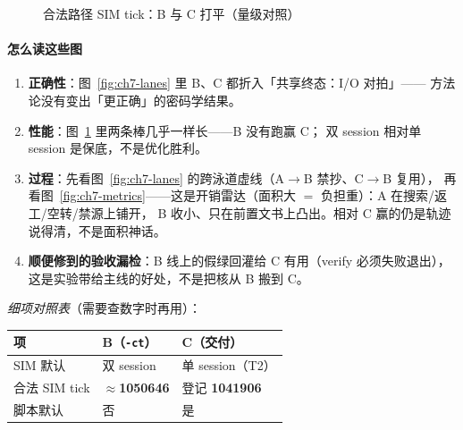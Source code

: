 \documentclass[UTF8,a4paper,11pt]{ctexart}
\theoremstyle{definition}
\theoremstyle{plain}
\theoremstyle{remark}
\numberwithin{figure}{section}
\numberwithin{table}{section}
\begin{document}
\begin{figure}[H]
\centering
{}
\caption{合法路径 SIM tick：B 与 C 打平（量级对照）}
\label{fig:ch7-tick}
\end{figure}

\paragraph{怎么读这些图}
\begin{enumerate}
  \item \textbf{正确性}：图~\ref{fig:ch7-lanes} 里 B、C 都折入「共享终态：I/O 对拍」——
        方法论没有变出「更正确」的密码学结果。
  \item \textbf{性能}：图~\ref{fig:ch7-tick} 里两条棒几乎一样长——B 没有跑赢 C；
        双 session 相对单 session 是保底，不是优化胜利。
  \item \textbf{过程}：先看图~\ref{fig:ch7-lanes} 的跨泳道虚线（A$\to$B 禁抄、C$\to$B 复用），
        再看图~\ref{fig:ch7-metrics}——这是开销雷达（面积大 $=$ 负担重）：A 在搜索/返工/空转/禁源上铺开，
        B 收小、只在前置文书上凸出。相对 C 赢的仍是轨迹说得清，不是面积神话。
  \item \textbf{顺便修到的验收漏检}：B 线上的假绿回灌给 C 有用（verify 必须失败退出），
        这是实验带给主线的好处，不是把核从 B 搬到 C。
\end{enumerate}

\noindent\textit{细项对照表}（需要查数字时再用）：
\begin{center}
\small
\begin{tabular}{@{}L{2.8cm}L{5.2cm}L{5.2cm}@{}}
  \toprule
  项 & B（\texttt{-ct}） & C（交付） \\
  \midrule
  SIM 默认 & 双 session & 单 session（T2） \\
  合法 SIM tick & $\approx$\textbf{1050646} & 登记 \textbf{1041906} \\
  脚本默认 & 否 & 是 \\
  \bottomrule
\end{tabular}
\end{center}
\end{document}
